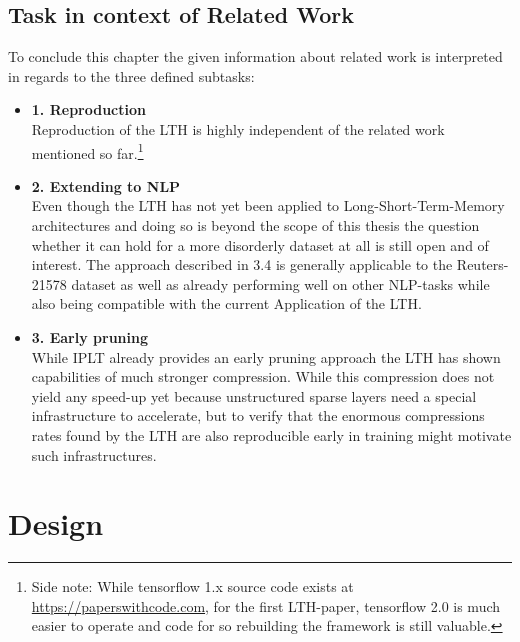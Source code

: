 \section{Task in context of Related Work}
To conclude this chapter the given information about related work is interpreted in regards to the three defined subtasks: 
\begin{itemize}
	\item \textbf{1. Reproduction}\\
	Reproduction of the LTH is highly independent of the related work mentioned so far.\footnote{Side note: While tensorflow 1.x source code exists at \href{https://paperswithcode.com}{https://paperswithcode.com}, for the first LTH-paper, tensorflow 2.0 is much easier to operate and code for so rebuilding the framework is still valuable.}\\ 
	\item \textbf{2. Extending to NLP}\\
	Even though the LTH has not yet been applied to Long-Short-Term-Memory architectures and doing so is beyond the scope of this thesis the question whether it can hold for a more disorderly dataset at all is still open and of interest. The approach described in 3.4 is generally applicable to the Reuters-21578 dataset as well as already performing well on other NLP-tasks while also being compatible with the current Application of the LTH.\\ 
	\item \textbf{3. Early pruning}\\
	While IPLT \cite{Pruning-With-Little-Training} already provides an early pruning approach the LTH has shown capabilities of much stronger compression. While this compression does not yield any speed-up yet because unstructured sparse layers need a special infrastructure to accelerate, but to verify that the enormous compressions rates found by the LTH are also reproducible early in training might motivate such infrastructures.\\
\end{itemize} 

\chapter{Design}
\label{ch:design}

